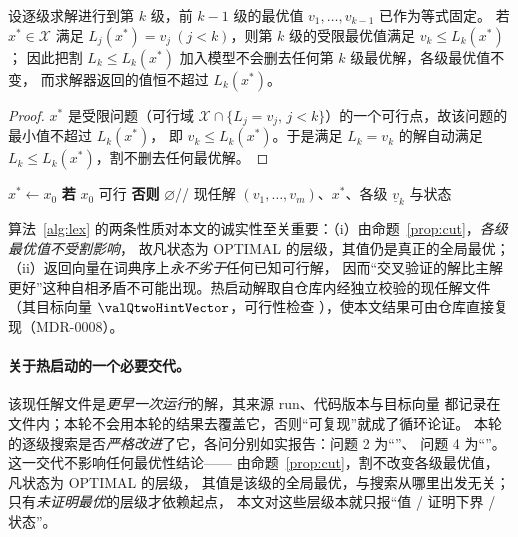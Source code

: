 \begin{proposition}[现任解上界割的有效性]\label{prop:cut}
设逐级求解进行到第 $k$ 级，前 $k-1$ 级的最优值 $v_1,\dots,v_{k-1}$ 已作为等式固定。
若 $x^\ast\in\mathcal{X}$ 满足 $L_j(x^\ast)=v_j\ (j<k)$，则第 $k$ 级的受限最优值满足 $v_k\le L_k(x^\ast)$；
因此把割 $L_k\le L_k(x^\ast)$ 加入模型不会删去任何第 $k$ 级最优解，各级最优值不变，
而求解器返回的值恒不超过 $L_k(x^\ast)$。
\end{proposition}
\begin{proof}
$x^\ast$ 是受限问题（可行域 $\mathcal{X}\cap\{L_j=v_j,\,j<k\}$）的一个可行点，故该问题的最小值不超过 $L_k(x^\ast)$，
即 $v_k\le L_k(x^\ast)$。于是满足 $L_k=v_k$ 的解自动满足 $L_k\le L_k(x^\ast)$，割不删去任何最优解。
\end{proof}

\begin{algorithm}[H]
\caption{现任解保持的词典序求解}\label{alg:lex}
$x^\ast\leftarrow x_0$ \textbf{若} $x_0$ 可行 \textbf{否则} $\varnothing$\quad// 现任解\;
\Return $(v_1,\dots,v_m)$、$x^\ast$、各级 $\underline{v}_k$ 与状态\;
\end{algorithm}

算法~\ref{alg:lex} 的两条性质对本文的诚实性至关重要：（i）由命题~\ref{prop:cut}，\emph{各级最优值不受割影响}，
故凡状态为 \textsf{OPTIMAL} 的层级，其值仍是真正的全局最优；（ii）返回向量在词典序上\emph{永不劣于}任何已知可行解，
因而“交叉验证的解比主解更好”这种自相矛盾不可能出现。热启动解取自仓库内经独立校验的现任解文件
（其目标向量 $\valQtwoHintVector$，可行性检查 \valQtwoHintFeasible{}），使本文结果可由仓库直接复现（MDR-0008）。

\paragraph{关于热启动的一个必要交代。}该现任解文件是\emph{更早一次运行}的解，其来源 run、代码版本与目标向量
都记录在文件内；本轮不会用本轮的结果去覆盖它，否则“可复现”就成了循环论证。
本轮的逐级搜索是否\emph{严格改进}了它，各问分别如实报告：问题 2 为“\valQtwoHintImproved{}”、
问题 4 为“\valQfourHintImproved{}”。这一交代不影响任何最优性结论——
由命题~\ref{prop:cut}，割不改变各级最优值，凡状态为 \textsf{OPTIMAL} 的层级，
其值是该级的全局最优，与搜索从哪里出发无关；只有\emph{未证明最优}的层级才依赖起点，
本文对这些层级本就只报“值 / 证明下界 / 状态”。

